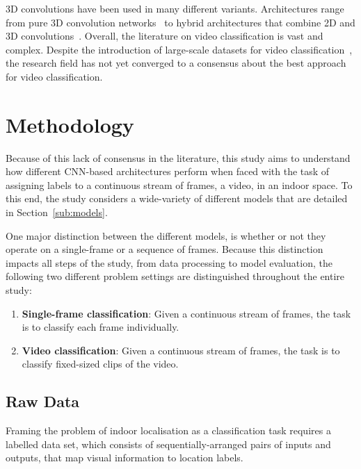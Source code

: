 \documentclass[a4paper]{article}
\begin{document}

3D convolutions have been used in many different variants. Architectures range
from pure 3D convolution networks~\cite{i3d, c3d} to hybrid architectures that
combine 2D and 3D convolutions~\cite{x3d, slowfast}. Overall, the literature on
video classification is vast and complex. Despite the introduction of
large-scale datasets for video classification~\cite{kinetics},
the research field has not yet converged to a consensus about the best approach
for video classification.

\section{Methodology} %
\label{sec:methodology}

Because of this lack of consensus in the literature, this study aims to
understand how different CNN-based architectures perform when faced with the
task of assigning labels to a continuous stream of frames, a video, in an indoor
space. To this end, the study considers a wide-variety of different models that
are detailed in Section~\ref{sub:models}.

One major distinction between the different models, is whether or not they
operate on a single-frame or a sequence of frames. Because this distinction
impacts all steps of the study, from data processing to model evaluation, the
following two different problem settings are distinguished throughout the entire
study:

\begin{enumerate}

\item \textbf{Single-frame classification}: Given a continuous stream of frames,
  the task is to classify each frame individually.

\item \textbf{Video classification}: Given a continuous stream of frames, the
  task is to classify fixed-sized clips of the video.

\end{enumerate}

\subsection{Raw Data} %
\label{sub:raw-data}

Framing the problem of indoor localisation as a classification task requires a
labelled data set, which consists of sequentially-arranged pairs of inputs and
outputs, that map visual information to location labels. 
\end{document}

